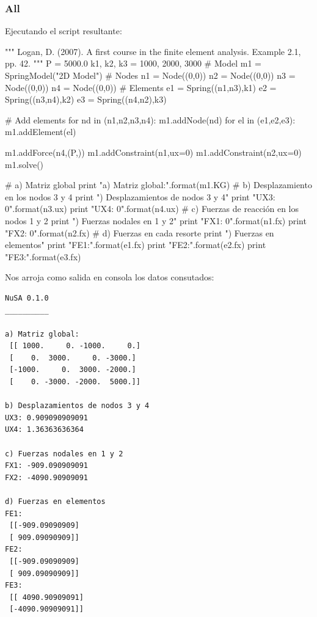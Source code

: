 \subsubsection*{All}

Ejecutando el script resultante:

\begin{python}
"""
Logan, D. (2007). A first course in the finite element analysis.
Example 2.1, pp. 42.
"""
P = 5000.0
k1, k2, k3 = 1000, 2000, 3000
# Model
m1 = SpringModel("2D Model")
# Nodes
n1 = Node((0,0))
n2 = Node((0,0))
n3 = Node((0,0))
n4 = Node((0,0))
# Elements
e1 = Spring((n1,n3),k1)
e2 = Spring((n3,n4),k2)
e3 = Spring((n4,n2),k3)

# Add elements 
for nd in (n1,n2,n3,n4):
    m1.addNode(nd)
for el in (e1,e2,e3):
    m1.addElement(el)

m1.addForce(n4,(P,))
m1.addConstraint(n1,ux=0)
m1.addConstraint(n2,ux=0)
m1.solve()

# a) Matriz global
print "a) Matriz global:".format(m1.KG)
# b) Desplazamiento en los nodos 3 y 4
print "\nb) Desplazamientos de nodos 3 y 4"
print "UX3: {0}".format(n3.ux)
print "UX4: {0}".format(n4.ux)
# c) Fuerzas de reacción en los nodos 1 y 2
print "\nc) Fuerzas nodales en 1 y 2"
print "FX1: {0}".format(n1.fx)
print "FX2: {0}".format(n2.fx)
# d) Fuerzas en cada resorte
print "\nd) Fuerzas en elementos"
print "FE1:".format(e1.fx)
print "FE2:".format(e2.fx)
print "FE3:".format(e3.fx)
\end{python}


Nos arroja como salida en consola los datos consutados:

\begin{verbatim}
NuSA 0.1.0
__________

a) Matriz global:
 [[ 1000.     0. -1000.     0.]
 [    0.  3000.     0. -3000.]
 [-1000.     0.  3000. -2000.]
 [    0. -3000. -2000.  5000.]]

b) Desplazamientos de nodos 3 y 4
UX3: 0.909090909091
UX4: 1.36363636364

c) Fuerzas nodales en 1 y 2
FX1: -909.090909091
FX2: -4090.90909091

d) Fuerzas en elementos
FE1:
 [[-909.09090909]
 [ 909.09090909]]
FE2:
 [[-909.09090909]
 [ 909.09090909]]
FE3:
 [[ 4090.90909091]
 [-4090.90909091]]
\end{verbatim}